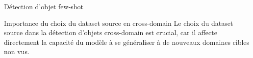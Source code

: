 \begin{subsectionframemod}{Détection d'objet few-shot}

    \begin{alertblock}{Importance du choix du dataset source en cross-domain}
        Le choix du dataset source dans la détection d'objets cross-domain est crucial,
        car il affecte directement la capacité du modèle à se généraliser à de nouveaux domaines cibles non vus.
    \end{alertblock}

    
\end{subsectionframemod}
